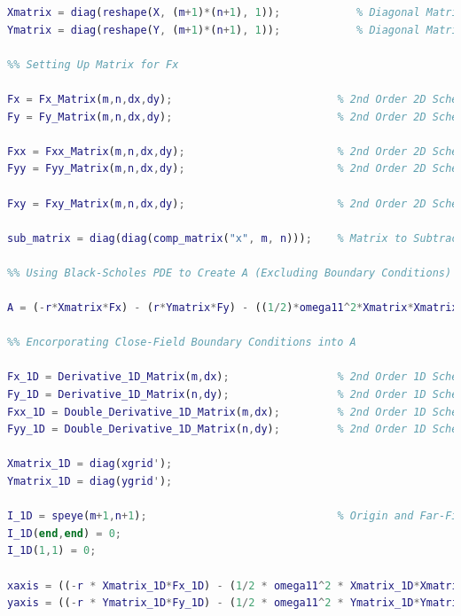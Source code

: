 \documentclass[12pt,letterpaper]{article}
\begin{document}
\begin{lstlisting}[language = Matlab]
Xmatrix = diag(reshape(X, (m+1)*(n+1), 1));            % Diagonal Matrix of X Mesh for Calculating A
Ymatrix = diag(reshape(Y, (m+1)*(n+1), 1));            % Diagonal Matrix of Y Mesh for Calculating A

%% Setting Up Matrix for Fx

Fx = Fx_Matrix(m,n,dx,dy);                          % 2nd Order 2D Scheme for First Derivative with Respect to X
Fy = Fy_Matrix(m,n,dx,dy);                          % 2nd Order 2D Scheme for First Derivative with Respect to Y

Fxx = Fxx_Matrix(m,n,dx,dy);                        % 2nd Order 2D Scheme for Second Derivative with Respect to X
Fyy = Fyy_Matrix(m,n,dx,dy);                        % 2nd Order 2D Scheme for Second Derivative with Respect to Y

Fxy = Fxy_Matrix(m,n,dx,dy);                        % 2nd Order 2D Scheme for Mixed Derivative with Respect to X and Y

sub_matrix = diag(diag(comp_matrix("x", m, n)));    % Matrix to Subtract from speye so All Boundary Conditions in A are Zero

%% Using Black-Scholes PDE to Create A (Excluding Boundary Conditions)

A = (-r*Xmatrix*Fx) - (r*Ymatrix*Fy) - ((1/2)*omega11^2*Xmatrix*Xmatrix * Fxx) - ((1/2)*omega11^2*Ymatrix*Ymatrix * Fyy) - (omega12^2*Xmatrix*Ymatrix*Fxy) + (r*(speye((m+1)*(n+1))-sub_matrix));

%% Encorporating Close-Field Boundary Conditions into A

Fx_1D = Derivative_1D_Matrix(m,dx);                 % 2nd Order 1D Scheme for First Derivative with Respect to X
Fy_1D = Derivative_1D_Matrix(n,dy);                 % 2nd Order 1D Scheme for First Derivative with Respect to Y
Fxx_1D = Double_Derivative_1D_Matrix(m,dx);         % 2nd Order 1D Scheme for Second Derivative with Respect to X
Fyy_1D = Double_Derivative_1D_Matrix(n,dy);         % 2nd Order 1D Scheme for Second Derivative with Respect to Y

Xmatrix_1D = diag(xgrid');
Ymatrix_1D = diag(ygrid');

I_1D = speye(m+1,n+1);                              % Origin and Far-Field Boundary Conditions Are Later Addressed
I_1D(end,end) = 0;
I_1D(1,1) = 0;

xaxis = ((-r * Xmatrix_1D*Fx_1D) - (1/2 * omega11^2 * Xmatrix_1D*Xmatrix_1D * Fxx_1D) + r*I_1D);
yaxis = ((-r * Ymatrix_1D*Fy_1D) - (1/2 * omega11^2 * Ymatrix_1D*Ymatrix_1D * Fyy_1D) + r*I_1D);



\end{lstlisting}
\end{document}
